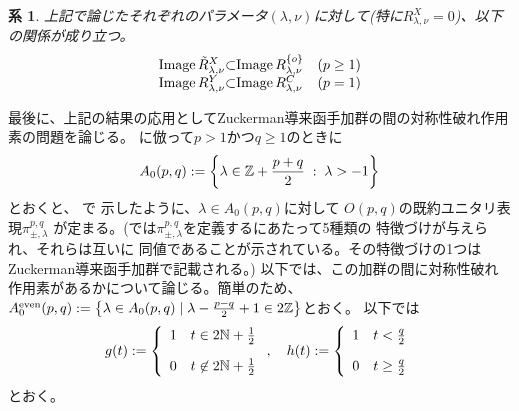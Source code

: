 \documentclass[12pt]{article} %
\newcommand{\nin}{\not\in}
\newtheorem{corollary}[theorem]{系}
\theoremstyle{definition}
\theoremstyle{exampstyle} \newtheorem{examp}[theorem]{Theorem}
\newcommand{\doubt}[1]{{#1}}
\begin{document}
			\begin{corollary}
				上記で論じたそれぞれのパラメータ$(\lambda,\nu)$に対して(特に$R_{\lambda,\nu}^X=0$)、以下の関係が成り立つ。
			\begin{equation*}
				\begin{array}[]{@{}l@{}l@{}ll@{}}
					\operatorname{Image}\tilde{R}_{\lambda,\nu}^X&\subset&\operatorname{Image}R_{\lambda,\nu}^{ \left\{ o \right\}}&(p\ge1)\\
					\operatorname{Image}R_{\lambda,\nu}^Y&\subset&\operatorname{Image}R_{\lambda,\nu}^C&(p=1)
				\end{array}
			\end{equation*}
			\end{corollary}

	最後に、上記の結果の応用としてZuckerman導来函手加群の間の対称性破れ作用素の問題を論じる。
\cite[(5.1.1)]{KO2}に\doubt{倣}って$p>1${かつ}$q\ge1$のときに\begin{equation*}
	A_0(p,q):=\left\{ \lambda\in\mathbb{Z}+\frac{p+q}{2}\;:\;\lambda>-1 \right\}
\end{equation*}とおくと、
\cite{KO2}で
示したように、$\lambda\in A_0(p,q)$に対して
$O(p,q)$の既約ユニタリ表現$\pi_{\pm,\lambda}^{p,q}$
が定まる。(\cite{KO2}では$\pi_{\pm,\lambda}^{p,q}$を定義するにあたって5種類の
特徴づけが与えら{れ}、それらは互いに
同値であることが示されている。その特徴づけの1つは
Zuckerman導来函手加群で記載される。)
以下では、この加群の間に対称性破れ作用素がある{か}について論じる。簡単のため、$A_0^{\mbox{\scriptsize even}}(p,q):=\left\{ \lambda\in A_0(p,q)\mid \lambda-\frac{p-q}{2}+1\in2\mathbb{Z} \right\}$とおく。
以下では\begin{equation*}
	g(t):=\left\{ \begin{array}[]{ll}
		1&t\in2\N+\frac{1}{2}\\[10pt]
		0&t\nin 2\N+\frac{1}{2}
	\end{array}\right.,\quad h(t):=\left\{ \begin{array}[]{ll}
		1&t<\frac{q}{2}\\[10pt]
		0&t\ge\frac{q}{2}
\end{array}\right.
\end{equation*}とおく。
\end{document}
